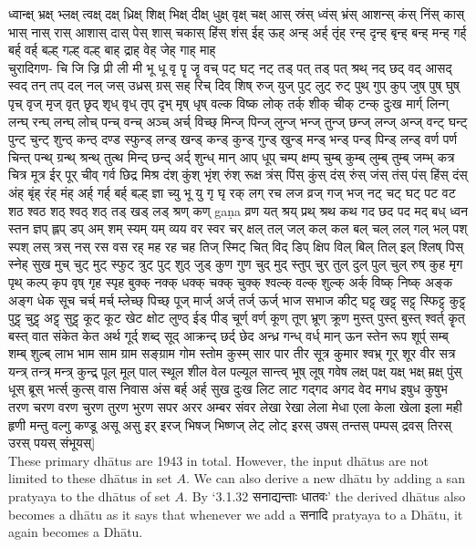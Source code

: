 {ध्वान्क्ष् भ्रक्ष् भ्लक्ष् त्वक्ष् दक्ष् ध्रिक्ष् शिक्ष् भिक्ष् दीक्ष् धुक्ष् वृक्ष् चक्ष् आस् स्रंस् ध्वंस् भ्रंस् आशन्स् कंस् निंस् कास् भास् नास् रास् आशास् दास् पेस् शास् चकास् हिंस् शंस् ईह् ऊह् अन्ह् अर्ह् तृंह् रन्ह् दृन्ह् बृन्ह् बन्ह् मन्ह् गर्ह् बर्ह् वर्ह् बल्ह् गल्ह् वल्ह् बाह् द्राह् वेह् जेह् गाह् माह् \\
	चुरादिगण- चि जि ज्रि प्री ली मी भू धू वृ पॄ जॄ वच् पट् घट् नट् तड् पत् तड् पत् श्रथ् नद् छद् वद् आसद् स्वद् तन् तप् दल् नल् जस् उध्रस् ग्रस् सह् रिच् दिव् शिष् रुज् युज् पुट् लुट् रुट् पुथ् गुप् कुप् जुष् पुष् घुष् पृच् वृज् मृज् वृत् छृद् शृध् वृध् तृप् दृभ् मृष् धृष् वल्क विष्क लोक् तर्क् शीक् चीक् टन्क् दुःख मार्ग् लिन्ग् लन्घ् रन्घ् लन्घ् लोच् पन्च् वन्च् अञ्च् अर्च् विच्छ् मिन्ज् पिन्ज् लुन्ज् भन्ज् तुन्ज् छन्ज् लन्ज् अन्ज् वन्ट् घन्ट् पुन्ट् चुन्ट् शुन्ठ् कन्ठ् दण्ड स्फुन्ड् लन्ड् खन्ड् कन्ड् कुन्ड् गुन्ड् खुन्ड् मन्ड् भन्ड् पन्ड् पिन्ड् लन्ड् वर्ण पर्ण चिन्त् पन्थ् ग्रन्थ् श्रन्थ् तुत्थ मिन्द् छन्द् अर्द् शुन्ध् मान् आप् धूप् चम्प् क्षम्प् चुम्ब् कुम्ब् लुम्ब् तुम्ब् जम्भ् कत्र चित्र मूत्र ईर् पूर् चीव् गर्व छिद्र मिश्र दंश् कुंश् भृंश् रुंश् रूक्ष त्रंस् पिंस् कुंस् दंस् रुंस् जंस् तंस् पंस् हिंस् दंस् अंह् बृंह् रंह् मंह् अर्ह् गर्ह् बर्ह् बल्ह् ज्ञा च्यु भू यु गृ घृ रक् लग् रच लज व्रज् गज् भज् नट् चट् घट् पट वट शठ श्वठ शठ् श्वठ् शठ् तड् खड् लड् श्रण् कण् gaṇa व्रण यत् श्रय् प्रथ् श्रथ कथ गद छद पद मद् बध् ध्वन स्तन ज्ञप् ह्लप् डप् अम् शम् स्यम् यम् व्यय वर स्वर चर् क्षल् तल् जल् कल् कल बल् चल् लल् गल् भल् पश् स्पश् लस् त्रस् नस् रस वस रह् मह रह चह तिज् स्मिट् चित् विद् डिप् क्षिप विल् बिल् तिल् इल् श्लिष् पिस् स्नेह् सुख मुच् चुट् मुट् स्फुट् त्रुट् पुट् शुठ् जुड् कुण गुण चुद् मुद् स्तुप् चुर् तुल् दुल् पुल् चुल् रुष् कुह मृग पृथ् कल्प् कृप वृष् गृह स्पृह बुक्क् नक्क् धक्क् चक्क् चुक्क् श्वल्क् वल्क् शुल्क् अर्क् विष्क् निष्क् अङ्क अङ्ग धेक सूच चर्च् मर्च् म्लेच्छ् पिच्छ् पूज् मार्ज् अर्ज् तर्ज् ऊर्ज् भाज सभाज कीट् घट्ट् खट्ट् सट्ट् स्फिट्ट् कुट्ट् पुट्ट् चुट्ट् अट्ट् सुट्ट् कूट् कूट खेट क्षोट लुण्ठ् ईड् पीड् चूर्ण् वर्ण् कूण् तूण् भ्रूण् क्रूण मुस्त् पुस्त् बुस्त् श्वर्त् कॄत् बस्त् वात संकेत केत अर्थ गूर्द् शब्द् सूद् आक्रन्द् छर्द् छेद अन्ध्र गन्ध् वर्ध् मान् ऊन स्तेन रूप शूर्प् सम्ब् शम्ब् शुल्ब् लाभ भाम साम ग्राम सङ्ग्राम गोम स्तोम कुस्म् सार पार तीर सूत्र कुमार श्वभ्र् गूर् शूर वीर सत्र यन्त्र् तन्त्र् मन्त्र् कुन्द्र् पूल् मूल् पाल् स्थूल शील वेल पल्यूल सान्त्व् भूष् लूष् गवेष लक्ष् पक्ष् यक्ष् भक्ष् म्रक्ष् पुंस् धूस् ब्रूस् भर्त्स् कुत्स् वास निवास अंस बर्ह् अर्ह् सुख दुःख लिट लाट गद्गद अगद वेद मगध इषुध कुषुभ तरण चरण वरण चुरण तुरण भुरण सपर अरर अम्बर संवर लेखा रेखा लेला मेधा एला केला खेला इला मही हृणी मन्तु वल्गु कण्डू असू असु इर् इरज् भिषज् भिष्णज् लेट् लोट् इरस् उषस् तन्तस् पम्पस् द्रवस् तिरस् उरस् पयस् संभूयस्}]
\\
These primary dhātus are 1943 in total. However, the input dhātus are not limited to these dhātus in set $A$. We can also derive a new dhātu by adding a san pratyaya to the dhātus of set $A$. By ‘3.1.32 \texthindi{सनाद्यन्ताः धातवः}’ the derived dhātus also becomes a dhātu as it says that whenever we add a \texthindi{सनादि} pratyaya to a Dhātu, it again becomes a Dhātu. \\

